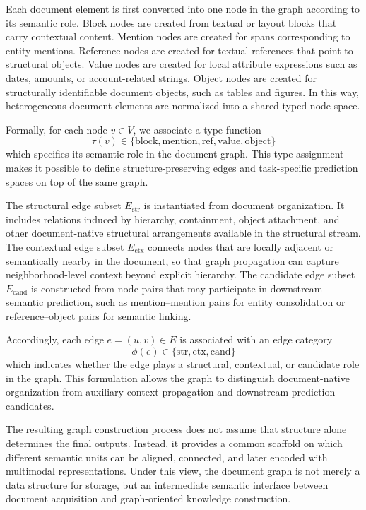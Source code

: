 \documentclass[pdflatex,twocolumn,iicol,sn-vancouver-num]{sn-jnl}%
\theoremstyle{thmstyleone}%
\theoremstyle{thmstyletwo}%
\theoremstyle{thmstylethree}%
\begin{document}
Each document element is first converted into one node in the graph according to its semantic role. Block nodes are created from textual or layout blocks that carry contextual content. Mention nodes are created for spans corresponding to entity mentions. Reference nodes are created for textual references that point to structural objects. Value nodes are created for local attribute expressions such as dates, amounts, or account-related strings. Object nodes are created for structurally identifiable document objects, such as tables and figures. In this way, heterogeneous document elements are normalized into a shared typed node space.

Formally, for each node \(v \in V\), we associate a type function
\begin{equation}
\tau(v) \in \{\mathrm{block}, \mathrm{mention}, \mathrm{ref}, \mathrm{value}, \mathrm{object}\}
\end{equation}
which specifies its semantic role in the document graph. This type assignment makes it possible to define structure-preserving edges and task-specific prediction spaces on top of the same graph.

The structural edge subset \(E_{\mathrm{str}}\) is instantiated from document organization. It includes relations induced by hierarchy, containment, object attachment, and other document-native structural arrangements available in the structural stream. The contextual edge subset \(E_{\mathrm{ctx}}\) connects nodes that are locally adjacent or semantically nearby in the document, so that graph propagation can capture neighborhood-level context beyond explicit hierarchy. The candidate edge subset \(E_{\mathrm{cand}}\) is constructed from node pairs that may participate in downstream semantic prediction, such as mention--mention pairs for entity consolidation or reference--object pairs for semantic linking.

Accordingly, each edge \(e = (u, v) \in E\) is associated with an edge category
\begin{equation}
\phi(e) \in \{\mathrm{str}, \mathrm{ctx}, \mathrm{cand}\}
\end{equation}
which indicates whether the edge plays a structural, contextual, or candidate role in the graph. This formulation allows the graph to distinguish document-native organization from auxiliary context propagation and downstream prediction candidates.

The resulting graph construction process does not assume that structure alone determines the final outputs. Instead, it provides a common scaffold on which different semantic units can be aligned, connected, and later encoded with multimodal representations. Under this view, the document graph is not merely a data structure for storage, but an intermediate semantic interface between document acquisition and graph-oriented knowledge construction.
\end{document}
